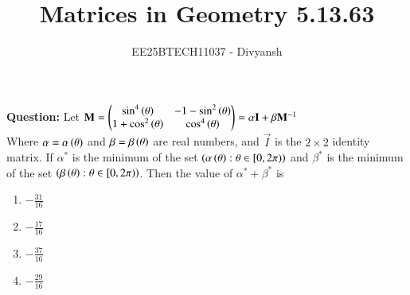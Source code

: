 \documentclass[journal,12pt,onecolumn]{IEEEtran}
\title{Matrices in Geometry 5.13.63}
\author{EE25BTECH11037 - Divyansh}
\theoremstyle{remark}
\begin{document}
\vspace{3cm}
\maketitle
{\let\newpage\relax\maketitle}
\textbf{Question: }
Let $\mathbf{M}=\begin{pmatrix}\sin^4\left(\theta\right) & -1-\sin^2\left(\theta\right) \\ 1+\cos^2\left(\theta\right) & \cos ^4\left(\theta\right)\end{pmatrix} = \alpha \mathbf{I} + \beta\mathbf{M}^{-1} $\\
Where $\alpha = \alpha\left(\theta\right)$ and $\beta = \beta \left(\theta\right)$ are real numbers, and $\vec{I}$ is the $2 \times 2$ identity matrix.
If $\alpha^*$ is the minimum of the set $\left(\alpha\left(\theta\right): \theta \in [0, 2\pi)\right) $ and $\beta^*$ is the minimum of the set
$\left(\beta\left(\theta\right) : \theta \in [0, 2\pi)\right)$. Then the value of $\alpha^* + \beta^*$ is
\begin{multicols}{4}
    \begin{enumerate}
        \item $-\frac{31}{16}$
        \item $-\frac{17}{16}$
        \item $-\frac{37}{16}$
        \item $-\frac{29}{16}$
    \end{enumerate}
\end{multicols}
\vspace{2mm}
\end{document}
